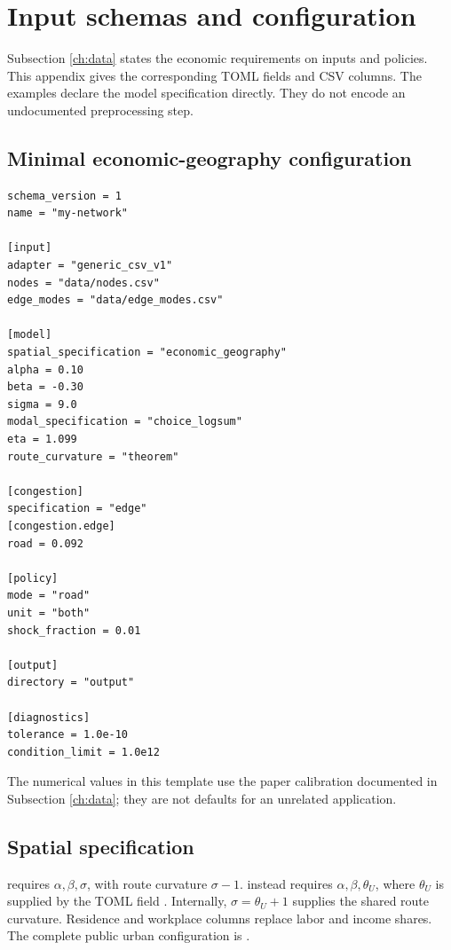 \section{Input schemas and configuration}
\label{app:config}

Subsection \ref{ch:data} states the economic requirements on inputs and policies.
This appendix gives the corresponding TOML fields and CSV columns. The
examples declare the model specification directly. They do not encode an
undocumented preprocessing step.

\subsection{Minimal economic-geography configuration}

\begin{lstlisting}
schema_version = 1
name = "my-network"

[input]
adapter = "generic_csv_v1"
nodes = "data/nodes.csv"
edge_modes = "data/edge_modes.csv"

[model]
spatial_specification = "economic_geography"
alpha = 0.10
beta = -0.30
sigma = 9.0
modal_specification = "choice_logsum"
eta = 1.099
route_curvature = "theorem"

[congestion]
specification = "edge"
[congestion.edge]
road = 0.092

[policy]
mode = "road"
unit = "both"
shock_fraction = 0.01

[output]
directory = "output"

[diagnostics]
tolerance = 1.0e-10
condition_limit = 1.0e12
\end{lstlisting}
The numerical values in this template use the paper calibration documented in
Subsection \ref{ch:data}; they are not defaults for an unrelated application.

\subsection{Spatial specification}

 requires \(\alpha,\beta,\sigma\), with route
curvature \(\sigma-1\).  instead requires
\(\alpha,\beta,\theta_U\), where \(\theta_U\) is supplied by the TOML field
. Internally, \(\sigma=\theta_U+1\) supplies the shared route
curvature. Residence and workplace columns replace labor and income shares.
The complete public urban configuration is
.

